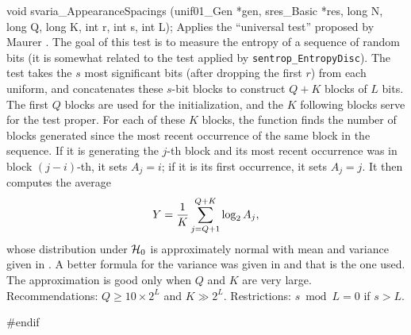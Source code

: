 void svaria_AppearanceSpacings (unif01_Gen *gen, sres_Basic *res,
                               long N, long Q, long K, int r, int s, int L);
\endcode
 \tab Applies the ``universal test'' proposed by Maurer \cite{rMAU92a}.
   The goal of this test is to measure the entropy of a sequence
   of
   random  bits (it is somewhat related to the test applied by
   {\tt sentrop\_EntropyDisc}).
   The test takes the $s$ most significant bits (after dropping the first
   $r$) from each uniform, and concatenates these $s$-bit blocks to 
   construct $Q + K$ blocks of $L$ bits.
   The first $Q$ blocks are used for the initialization, and
   the $K$ following blocks serve for the test proper.
   For each of these $K$ blocks, the function finds the number of blocks
   generated since the most recent occurrence of the same block in the
   sequence. If it is generating the $j$-th block and its most recent 
   occurrence was in block $(j-i)$-th, it sets $A_j = i$;
   if it is its first occurrence, it sets $A_j = j$.
   It then computes the average 
      $$ Y = {1\over K} \sum_{j=Q+1}^{Q+K} \log_2 A_j, $$
   whose distribution under $\mathcal{H}_0$ is approximately normal with 
   mean and variance given in \cite{rMAU92a}. A better formula for the
   variance was given in \cite{rCOR99a} and that is the one used.
   The approximation is good only when $Q$ and $K$ are very large.
   Recommendations: $Q\ge 10 \times 2^{L}$ and $K \gg 2^{L}$.
   Restrictions: $s \bmod L = 0$ if $s > L$.
 \endtab

\code
\hide
#endif
\endhide
\endcode
